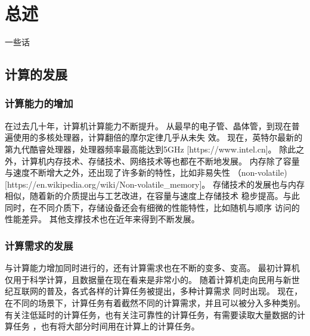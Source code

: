 \chapter{总述} %

\label{Chapter1} %

一些话


\section{计算的发展}

\subsection{计算能力的增加}

在过去几十年，计算机计算能力不断提升。
从最早的电子管、晶体管，到现在普遍使用的多核处理器，计算翻倍的摩尔定律几乎从未失
效。
现在，英特尔最新的第九代酷睿处理器，处理器频率最高能达到5GHz
[https://www.intel.cn]。
除此之外，计算机内存技术、存储技术、网络技术等也都在不断地发展。
内存除了容量与速度不断增大之外，还出现了许多新的特性，比如非易失性
（non-volatile)[https://en.wikipedia.org/wiki/Non-volatile_memory]。
存储技术的发展也与内存相似，随着新的介质提出与工艺改进，在容量与速度上存储技术
稳步提高。与此同时，在不同介质下，存储设备还会有细微的性能特性，比如随机与顺序
访问的性能差异。
其他支撑技术也在近年来得到不断发展。

\subsection{计算需求的发展}

与计算能力增加同时进行的，还有计算需求也在不断的变多、变高。
最初计算机仅用于科学计算，且数据量在现在看来是非常小的。
随着计算机走向民用与新世纪互联网的普及，各式各样的计算任务被提出，多种计算需求
同时出现。
现在，在不同的场景下，计算任务有着截然不同的计算需求，并且可以被分入多种类别。
有关注低延时的计算任务，也有关注可靠性的计算任务，有需要读取大量数据的计算任务
，也有将大部分时间用在计算上的计算任务。

